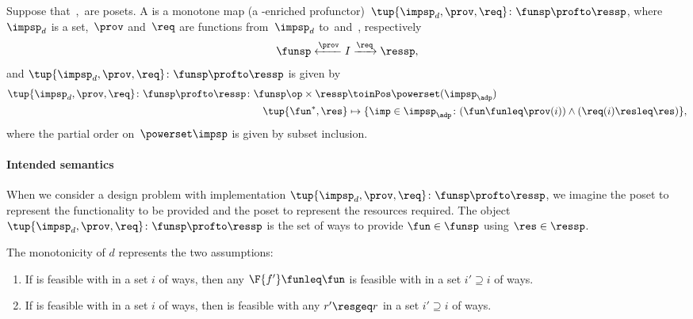 \begin{definition}
  \label{def:dpwithimp}
  Suppose that~\funsp,~\ressp are posets. A \emph{} is a monotone map (a \Set-enriched profunctor)~$\tup{\impsp_d,\prov,\req}\colon \funsp\profto \ressp$, where~$\impsp_d$ is a set,~$\prov$ and~$\req$ are functions from~$\impsp_d$ to~\funsp and~\ressp, respectively
  \begin{equation*}
    \funsp \xleftarrow{\prov} I \xrightarrow{\req} \ressp,
  \end{equation*}
  and $\tup{\impsp_d,\prov,\req}\colon \funsp\profto \ressp$ is given by
  \begin{equation*}
    \begin{aligned}
      \tup{\impsp_d,\prov,\req}\colon \funsp\profto \ressp \colon \funsp\op \times \ressp &\toinPos \powerset(\impsp_\adp) \\
      \tup{\fun^*, \res} &\mapsto \{ \imp \in \impsp_\adp \colon ( \fun \funleq \prov(i)) \wedge (\req(i) \resleq \res) \},
    \end{aligned}
  \end{equation*}
  where the partial order on~$\powerset\impsp$ is given by subset inclusion.
\end{definition}

\paragraph{Intended semantics} When we consider a design problem with implementation $\tup{\impsp_d, \prov, \req}\colon \funsp\profto \ressp$, we imagine the poset \funsp to represent the functionality to be provided and the poset \ressp to represent the resources required. The object $\tup{\impsp_d,\prov,\req}\colon \funsp\profto \ressp$ is the set of ways to provide $\fun\in \funsp$ using $\res\in \ressp$.

\noindent The monotonicity of $d$ represents the two assumptions:
\begin{enumerate}
  \item If \fun is feasible with \res in a set $i$ of ways, then any $\F{f'}\funleq \fun$ is feasible with \res in a set $i'\supseteq i$ of ways.
  \item If \fun is feasible with \res in a set $i$ of ways, then \fun is feasible with any $r'\resgeq r$ in a set $i'\supseteq i$ of ways.
\end{enumerate}

